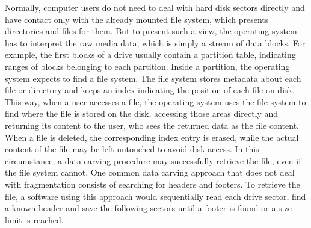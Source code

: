 
Normally, computer users do not need to deal with hard disk sectors directly and have contact only with the already mounted file system, which presents directories and files for them. But to present such a view, the operating system has to interpret the raw media data, which is simply a stream of data blocks. For example, the first blocks of a drive usually contain a partition table, indicating ranges of blocks belonging to each partition. Inside a partition, the operating system expects to find a file system. The file system stores metadata about each file or directory and keeps an index indicating the position of each file on disk. This way, when a user accesses a file, the operating system uses the file system to find where the file is stored on the disk, accessing those areas directly and returning its content to the user, who sees the returned data as the file content. 
When a file is deleted, the corresponding index entry is erased, while the actual content of the file may be left untouched to avoid disk access. In this circumstance, a data carving procedure may successfully retrieve the file, even if the file system cannot. One common data carving approach that does not deal with fragmentation consists of searching for headers and footers. To retrieve the file, a software using this approach would sequentially read each drive sector, find a known header and save the following sectors until a footer is found or a size limit is reached. 
